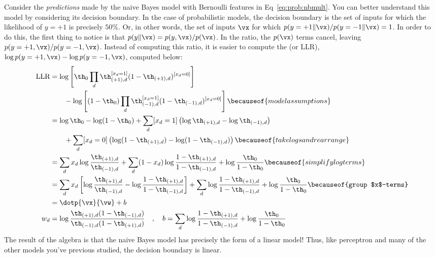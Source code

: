 Consider the \emph{predictions} made by the naive Bayes model with
Bernoulli features in Eq~\eqref{eq:prob:nbmult}.  You can better
understand this model by considering its decision boundary.  In the
case of probabilistic models, the decision boundary is the set of
inputs for which the likelihood of $y=+1$ is precisely $50\%$.  Or, in
other words, the set of inputs $\vx$ for which $p(y=+1 \| \vx) /
p(y=-1 \| \vx) = 1$.  In order to do this, the first thing to notice
is that $p(y \| \vx) = p(y,\vx) / p(\vx)$.  In the ratio, the $p(\vx)$
terms cancel, leaving $p(y=+1,\vx) / p(y=-1,\vx)$.  Instead of
computing this ratio, it is easier to compute the
 (or LLR), $\log p(y=+1,\vx) - \log
p(y=-1,\vx)$, computed below:
%
\begin{align}
\text{LLR}
&= \log \left[ \th_0 \prod_d \th_{(+1),d}^{[x_d=1]} (1-\th_{(+1),d})^{[x_d=0]} \right] \nonumber\\
&\qquad - \log \left[ (1-\th_0) \prod_d \th_{(-1),d}^{[x_d=1]} (1-\th_{(-1),d})^{[x_d=0]} \right]
   \becauseof{model assumptions} \\
&= \log \th_0 - \log (1-\th_0)  + \sum_d [x_d=1] \left( \log \th_{(+1),d} - \log \th_{(-1),d} \right) \nonumber\\
&\qquad+ \sum_d [x_d=0] \left( \log (1-\th_{(+1),d}) - \log (1-\th_{(-1),d}) \right)
   \becauseof{take logs and rearrange} \\
&= \sum_d x_d \log \frac {\th_{(+1),d}} {\th_{(-1),d}}
 + \sum_d (1-x_d) \log \frac {1-\th_{(+1),d}} {1-\th_{(-1),d}}
 + \log \frac {\th_0} {1-\th_0}
    \becauseof{simplify log terms} \\
&= \sum_d x_d \left[ \log \frac {\th_{(+1),d}} {\th_{(-1),d}} - \log \frac {1-\th_{(+1),d}} {1-\th_{(-1),d}} \right]
 + \sum_d \log \frac {1-\th_{(+1),d}} {1-\th_{(-1),d}}
 + \log \frac {\th_0} {1-\th_0}
    \becauseof{group $x$-terms} \\
&= \dotp{\vx}{\vw} + b \\
w_d &= \log \frac {\th_{(+1),d} (1-\th_{(-1),d})} {\th_{(-1),d} (1-\th_{(+1),d})}
\quad,\quad
b   = \sum_d \log \frac {1-\th_{(+1),d}} {1-\th_{(-1),d}}
 + \log \frac {\th_0} {1-\th_0}
\end{align}
%
The result of the algebra is that the naive Bayes model has precisely
the form of a linear model!  Thus, like perceptron and many of the
other models you've previous studied, the decision boundary is linear.

